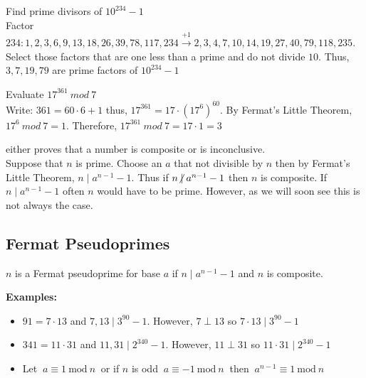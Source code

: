 \documentclass[12pt]{extarticle}
\newcommand{\divides}{\mid}
\newcommand{\ndivides}{\centernot \mid}
\newenvironment{definition}[1][Definition:]{\begin{trivlist}
\item[\hskip \labelsep {\bfseries #1}]}{\end{trivlist}}
\renewcommand{\mod}[3]{\: #1 \equiv #2 \: \mathrm{mod} \: #3 \:}
\begin{document}
\begin{definition}[Example:]
Find prime divisors of $10^{234} - 1$ \\ Factor $234: 1,2,3,6,9,13,18,26,39,78,117,234 \xrightarrow{+1} 2,3,4,7,10,14,19,27,40,79,118,235$. Select those factors that are one less than a prime and do not divide $10$. Thus, $3,7,19,79$ are prime factors of $10^{234} - 1$ 
\end{definition}

\begin{definition}[Example:]
Evaluate $17^{361} \: mod \: 7$ \\
Write: $361 = 60 \cdot 6 + 1$ thus, $17^{361} = 17 \cdot (17^6)^{60}$. By Fermat's Little Theorem, $17^6 \: mod \: 7 = 1$. Therefore, $17^{361} \: mod \: 7 = 17 \cdot 1 = 3$
\end{definition}

\begin{definition}[Composite Test:]
either proves that a number is composite or is inconclusive. \\
Suppose that $n$ is prime. Choose an $a$ that not divisible by $n$ then by Fermat's Little Theorem, $n \divides a^{n-1} - 1$. Thus if $n \ndivides a^{n-1} - 1$ then $n$ is composite. If $n \divides a^{n-1} - 1$ often $n$ would have to be prime. However, as we will soon see this is not always the case. 
\end{definition}


\newpage
\subsection{Fermat Pseudoprimes}

\begin{definition}
$n$ is a Fermat pseudoprime for base $a$ if $n \divides a^{n-1} - 1$ and $n$ is composite. 
\end{definition}

\noindent\textbf{Examples:}
\begin{itemize}
\item $91 = 7  \cdot 13$ and $7,13 \divides 3^{90} -1$. However, $7 \perp 13$ so $7 \cdot 13 \divides 3^{90} - 1$

\item $341 = 11  \cdot 31$ and $11,31 \divides 2^{340} - 1$. However, $11 \perp 31$ so $11 \cdot  31 \divides 2^{340} - 1$

\item Let $\mod{a}{1}{n}$ or if $n$ is odd $\mod{a}{-1}{n}$ then $\mod{a^{n-1}}{1}{n}$

\end{itemize}
\end{document}
